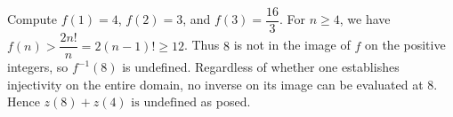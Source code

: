 Compute $f(1)=4$, $f(2)=3$, and $f(3)=\dfrac{16}{3}$. For $n\ge4$, we have $f(n)>\dfrac{2n!}{n}=2(n-1)!\ge12$. Thus $8$ is not in the image of $f$ on the positive integers, so $f^{-1}(8)$ is undefined. Regardless of whether one establishes injectivity on the entire domain, no inverse on its image can be evaluated at 8. Hence $\boxed{z(8)+z(4)\text{ is undefined}}$ as posed.
